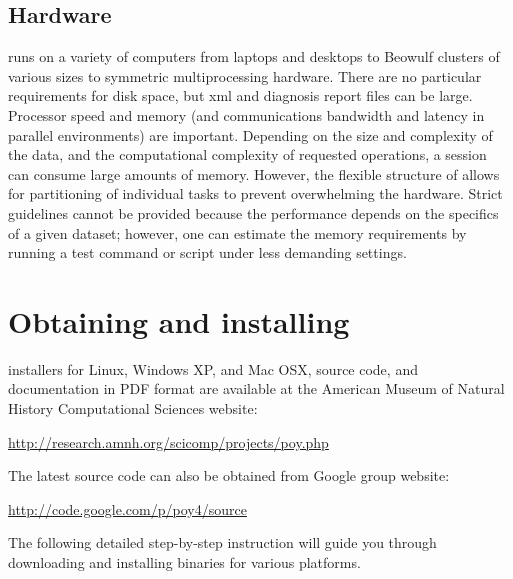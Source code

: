 \subsection{Hardware}
\poy runs on a variety of computers from laptops and desktops to Beowulf clusters 
of various sizes to symmetric multiprocessing hardware. There are no
particular requirements for disk space, but xml and diagnosis report files can be large. Processor speed and memory (and
communications bandwidth and latency in parallel environments) are important.
Depending on the size and complexity of the data, and the computational
complexity of requested operations, a \poy session can consume large amounts of memory.
However, the flexible structure of \poy allows for partitioning of individual
tasks to prevent overwhelming the hardware. Strict guidelines cannot be
provided because the performance depends on the specifics of a given
dataset; however, one can estimate the memory requirements by running a test command
or script under less demanding settings.

\section{Obtaining and installing \poy}

\poy installers for Linux, Windows XP, and Mac OSX, source code, and documentation in PDF format are available at the American Museum of Natural History Computational Sciences \poy website:
\begin{center}
\url{http://research.amnh.org/scicomp/projects/poy.php}
\end{center}
The latest source code can also be obtained from \poy Google group website:
\begin{center}
\url{http://code.google.com/p/poy4/source}
\end{center}
The following detailed step-by-step instruction will guide you through downloading and installing \poy binaries for various platforms.


